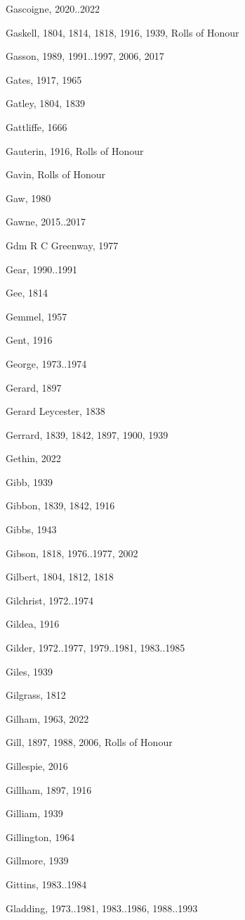 {\begin{theindex}
\item Gascoigne, 2020..2022
\item Gaskell, 1804, 1814, 1818, 1916, 1939, Rolls of Honour
\item Gasson, 1989, 1991..1997, 2006, 2017
\item Gates, 1917, 1965
\item Gatley, 1804, 1839
\item Gattliffe, 1666
\item Gauterin, 1916, Rolls of Honour
\item Gavin, Rolls of Honour
\item Gaw, 1980
\item Gawne, 2015..2017
\item Gdm R C Greenway, 1977
\item Gear, 1990..1991
\item Gee, 1814
\item Gemmel, 1957
\item Gent, 1916
\item George, 1973..1974
\item Gerard, 1897
\item Gerard Leycester, 1838
\item Gerrard, 1839, 1842, 1897, 1900, 1939
\item Gethin, 2022
\item Gibb, 1939
\item Gibbon, 1839, 1842, 1916
\item Gibbs, 1943
\item Gibson, 1818, 1976..1977, 2002
\item Gilbert, 1804, 1812, 1818
\item Gilchrist, 1972..1974
\item Gildea, 1916
\item Gilder, 1972..1977, 1979..1981, 1983..1985
\item Giles, 1939
\item Gilgrass, 1812
\item Gilham, 1963, 2022
\item Gill, 1897, 1988, 2006, Rolls of Honour
\item Gillespie, 2016
\item Gillham, 1897, 1916
\item Gilliam, 1939
\item Gillington, 1964
\item Gillmore, 1939
\item Gittins, 1983..1984
\item Gladding, 1973..1981, 1983..1986, 1988..1993

\end{theindex}}
